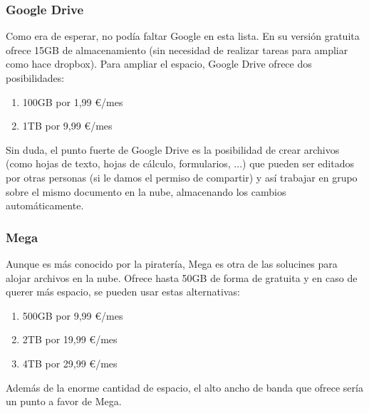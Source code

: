 \hfill\begin{minipage}{\dimexpr\textwidth-1cm}
\subsubsection{Google Drive \cite{cita_google_drive}}
Como era de esperar, no podía faltar Google en esta lista. En su versión gratuita ofrece 15GB de almacenamiento (sin necesidad de realizar tareas para ampliar como hace dropbox). Para ampliar el espacio, Google Drive ofrece dos posibilidades:
\begin{enumerate}[label=(\alph*)]
	\item 100GB por 1,99 \euro/mes
	\item 1TB por 9,99 \euro/mes
\end{enumerate}
Sin duda, el punto fuerte de Google Drive es la posibilidad de crear archivos (como hojas de texto, hojas de cálculo, formularios, ...) que pueden ser editados por otras personas (si le damos el permiso de compartir) y así trabajar en grupo sobre el mismo documento en la nube, almacenando los cambios automáticamente. \\
\end{minipage}

\hfill\begin{minipage}{\dimexpr\textwidth-1cm}
\subsubsection{Mega \cite{cita_mega}}
Aunque es más conocido por la piratería, Mega es otra de las solucines para alojar archivos en la nube. Ofrece hasta 50GB de forma de gratuita y en caso de querer más espacio, se pueden usar estas alternativas:
\begin{enumerate}[label=(\alph*)]
	\item 500GB por 9,99 \euro/mes
	\item 2TB por 19,99 \euro/mes
	\item 4TB por 29,99 \euro/mes
\end{enumerate}
Además de la enorme cantidad de espacio, el alto ancho de banda que ofrece sería un punto a favor de Mega. \\
\end{minipage}

